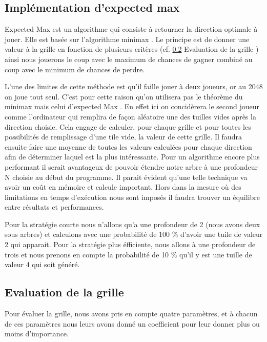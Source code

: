 \documentclass[12pt]{article}
\begin{document}
\subsection{Implémentation d'expected max}
\og Expected Max \fg{} est un algorithme qui consiste \`a retourner la direction
optimale \`a jouer. Elle est bas\'ee sur l'algorithme \og minimax \fg{}. Le
principe est de donner une valeur à la grille en fonction de plusieurs critères
(cf. \og \ref{eval_grid} Evaluation de la grille \fg{}) ainsi nous jouerons le
coup avec le maximum de chances de gagner combiné au coup avec le minimum de
chances de perdre.
\par L'une des limites de cette m\'ethode est qu'il faille jouer \`a deux
joueurs, or au 2048 on joue tout seul. C'est pour cette raison qu'on utilisera pas le
th\'eor\`eme du \og minimax \fg{} mais celui d'\og expected Max \fg{}. En effet
ici on concid\`erera le second joueur comme l'ordinateur qui remplira de façon
aléatoire une des tuilles vides apr\`es la direction choisie. Cela engage de
calculer, pour chaque grille et pour toutes les possibilit\'es de remplissage
d'une tile vide, la valeur de cette grille. Il faudra ensuite faire une moyenne
de toutes les valeurs calculées pour chaque direction afin de déterminer laquel
est la plus intéressante. Pour un algorithme encore plus performant il serait
avantageux de pouvoir \'etendre notre arbre \`a une profondeur N choisie au
d\'ebut du programme. Il parait évident qu'une telle technique va avoir un coût
en mémoire et calcule important. Hors dans la mesure où des limitations en temps
d'exécution nous sont imposés il faudra trouver un équilibre entre résultats et
performances.
\par Pour la strat\'egie courte nous n'allons qu'a une profondeur de 2 (nous
avons deux sous arbres) et calculons avec une probabilit\'e de 100 \%
d'avoir une tuile de valeur 2 qui apparait. Pour la strat\'egie plus
\'efficiente, nous allons \`a une profondeur de trois et nous prenons en compte
la probabilit\'e de 10 \% qu'il y est une tuille de valeur 4 qui soit
g\'en\'er\'e.

\subsection{Evaluation de la grille}
\label{eval_grid}
Pour évaluer la grille, nous avons pris en compte quatre paramètres, et à chacun
de ces paramètres nous leurs avons donné un coefficient pour leur donner plus ou
moins d'importance. \cite{Eval}
\end{document}
